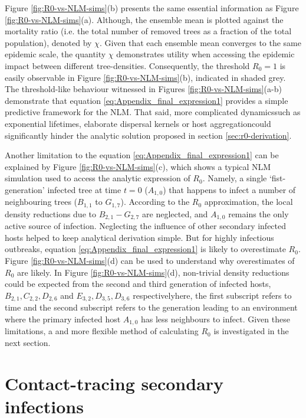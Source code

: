 Figure \ref{fig:R0-vs-NLM-sims}(b) presents the same essential information as Figure \ref{fig:R0-vs-NLM-sims}(a).
Although, the ensemble mean is plotted against the mortality ratio (i.e. the total number of removed trees as a fraction of the total population), denoted by $\chi$.
Given that each ensemble mean converges to the same epidemic scale, the quantity $\chi$ demonstrates utility when accessing the epidemic impact between different tree-densities.
Consequently, the threshold $R_0=1$ is easily observable in Figure \ref{fig:R0-vs-NLM-sims}(b), indicated in shaded grey.
The threshold-like behaviour witnessed in Figures \ref{fig:R0-vs-NLM-sims}(a-b) demonstrate that equation \ref{eq:Appendix_final_expression1} provides a simple predictive framework for the  NLM.
That said, more complicated dynamics\textemdash such as exponential lifetimes, elaborate dispersal kernels or host aggregation\textemdash could significantly hinder the analytic solution proposed in section \ref{sec:r0-derivation}.

Another limitation to the equation \ref{eq:Appendix_final_expression1} can be explained by Figure \ref{fig:R0-vs-NLM-sims}(c), which shows a typical NLM simulation used to access the analytic expression of $R_0$.
Namely, a single `fist-generation' infected tree at time $t=0$ ($A_{1, 0}$) that happens to infect a number of neighbouring trees ($B_{1,1}$ to $G_{1, 7}$).
According to the $R_0$ approximation, the local density reductions due to $B_{2,1}-G_{2, 7}$ are neglected, and $A_{1, 0}$ remains the only active source of infection.
Neglecting the influence of other secondary infected hosts helped to keep analytical derivation simple.
But for highly infectious outbreaks, equation \ref{eq:Appendix_final_expression1} is likely to overestimate $R_0$.
Figure \ref{fig:R0-vs-NLM-sims}(d) can be used to understand why overestimates of $R_0$ are likely.
In Figure \ref{fig:R0-vs-NLM-sims}(d), non-trivial density reductions could be expected from the second and third generation of infected hosts, $B_{2,1}, C_{2, 2}, D_{2, 6}$ and $E_{3, 2}, D_{3, 5}, D_{3, 6}$ respectively\textemdash here, the first subscript refers to time and the second subscript refers to the generation\textemdash 
leading to an environment where the primary infected host $A_{1, 0}$ has less neighbours to infect.
Given these limitations, a and more flexible method of calculating $R_0$ is investigated in the next section.

\section{Contact-tracing secondary infections}
\label{sec:contract-traced-R0}

